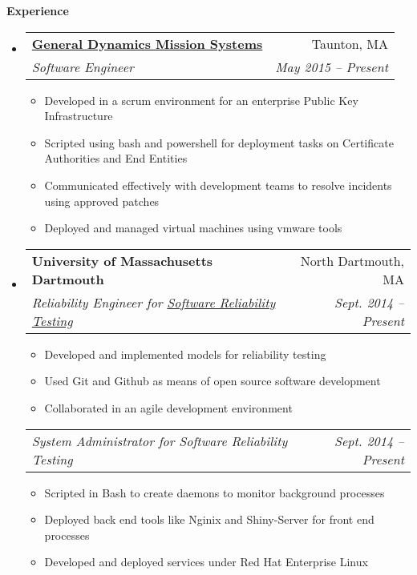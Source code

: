 \documentclass[letterpaper,11pt]{article}
\makeatletter
\newcommand{\resitem}[1]{\item #1 \vspace{-2pt}}
\newcommand{\resheading}[1]{{\large \colorbox{mygrey}{\begin{minipage}{\textwidth}{\textbf{#1 \vphantom{p\^{E}}}}\end{minipage}}}}
\newcommand{\ressubheading}[4]{
\begin{tabular*}{6.5in}{l@{\extracolsep{\fill}}r}
		\textbf{#1} & #2 \\
		\textit{#3} & \textit{#4} \\
\end{tabular*}\vspace{-6pt}}
\newcommand{\ressubsubheading}[2]{
\begin{tabular*}{6.5in}{l@{\extracolsep{\fill}}r}
		\textit{#1} & \textit{#2} \\
\end{tabular*}\vspace{-6pt}}
\makeatother
\begin{document}
\resheading{Experience}
	\begin{itemize}
		\item 
			\ressubheading{\href{https://www.gd-ais.com/}{General Dynamics Mission Systems}}{Taunton, MA}
				{Software Engineer}{May 2015 -- Present}
				{ \footnotesize
				\begin{itemize}
					\resitem{Developed in a scrum environment for an enterprise Public Key Infrastructure}
					\resitem{Scripted using bash and powershell for deployment tasks on Certificate Authorities and End Entities}
					\resitem{Communicated effectively with development teams to resolve incidents using approved patches}
                    \resitem{Deployed and managed virtual machines using vmware tools}

				\end{itemize}
				}
            \item{ 
            \ressubheading{{University of Massachusetts Dartmouth}}{North Dartmouth, MA}{Reliability Engineer for \href{http://github.com/lfiondella/SRT}{Software Reliability Testing}}{Sept. 2014 -- Present}
				{ \footnotesize
				\begin{itemize}
					\resitem{Developed and implemented models for reliability testing}
					\resitem{Used Git and Github as means of open source software development}
					\resitem{Collaborated in an agile development environment}
				\end{itemize}
				}
             \ressubsubheading{System Administrator for Software Reliability Testing}{Sept. 2014 -- Present}
          { \footnotesize
				\begin{itemize}
					\resitem{Scripted in Bash to create daemons to monitor background processes}
					\resitem{Deployed back end tools like Nginix and Shiny-Server for front end processes}
					\resitem{Developed and deployed services under Red Hat Enterprise Linux}
				\end{itemize}
    		}
        }
\begin{comment}
		\item
			\ressubheading{\href{http://www.byui.edu}{Brigham Young University - Idaho}}{Rexburg, ID}{Student Computer Lab Administrator - Lead Tech}{May 2008 -- Apr. 2009}
				{ \footnotesize
				\begin{itemize}
					\resitem{Trained, coordinated, and guided a small team of students towards the completion of tasks involving all computer labs on campus}
					\resitem{Administrated 62 labs, 1,300+ computers, and 17 PXE Servers in a two domain environment;  Utilized \href{http://www.symantec.com/business/deployment-solution}{Altiris Deployment Console} and scripting;  Specialized in \href{http://www.redhat.com/rhel/}{RHE Linux} deployments}

\end{comment}
\end{itemize}
\end{document}
